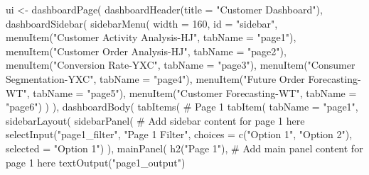 \documentclass[
  11pt,
]{article}
\newenvironment{Shaded}{\begin{snugshade}}{\end{snugshade}}
\newcommand{\AttributeTok}[1]{\textcolor[rgb]{0.40,0.45,0.13}{#1}}
\newcommand{\CommentTok}[1]{\textcolor[rgb]{0.37,0.37,0.37}{#1}}
\newcommand{\DecValTok}[1]{\textcolor[rgb]{0.68,0.00,0.00}{#1}}
\newcommand{\FunctionTok}[1]{\textcolor[rgb]{0.28,0.35,0.67}{#1}}
\newcommand{\NormalTok}[1]{\textcolor[rgb]{0.00,0.23,0.31}{#1}}
\newcommand{\OtherTok}[1]{\textcolor[rgb]{0.00,0.23,0.31}{#1}}
\newcommand{\StringTok}[1]{\textcolor[rgb]{0.13,0.47,0.30}{#1}}
\begin{document}
\begin{Shaded}
\begin{Highlighting}[]
\NormalTok{ui }\OtherTok{\textless{}{-}} \FunctionTok{dashboardPage}\NormalTok{(}
  \FunctionTok{dashboardHeader}\NormalTok{(}\AttributeTok{title =} \StringTok{"Customer Dashboard"}\NormalTok{),}
  \FunctionTok{dashboardSidebar}\NormalTok{(}
    \FunctionTok{sidebarMenu}\NormalTok{( }\AttributeTok{width =} \DecValTok{160}\NormalTok{,}
      \AttributeTok{id =} \StringTok{"sidebar"}\NormalTok{,}
      \FunctionTok{menuItem}\NormalTok{(}\StringTok{"Customer Activity Analysis{-}HJ"}\NormalTok{, }\AttributeTok{tabName =} \StringTok{"page1"}\NormalTok{),}
      \FunctionTok{menuItem}\NormalTok{(}\StringTok{"Customer Order Analysis{-}HJ"}\NormalTok{, }\AttributeTok{tabName =} \StringTok{"page2"}\NormalTok{),}
      \FunctionTok{menuItem}\NormalTok{(}\StringTok{"Conversion Rate{-}YXC"}\NormalTok{, }\AttributeTok{tabName =} \StringTok{"page3"}\NormalTok{),}
      \FunctionTok{menuItem}\NormalTok{(}\StringTok{"Consumer Segmentation{-}YXC"}\NormalTok{, }\AttributeTok{tabName =} \StringTok{"page4"}\NormalTok{),}
      \FunctionTok{menuItem}\NormalTok{(}\StringTok{"Future Order Forecasting{-}WT"}\NormalTok{, }\AttributeTok{tabName =} \StringTok{"page5"}\NormalTok{),}
      \FunctionTok{menuItem}\NormalTok{(}\StringTok{"Customer Forecasting{-}WT"}\NormalTok{, }\AttributeTok{tabName =} \StringTok{"page6"}\NormalTok{)}
\NormalTok{    )}
\NormalTok{  ),}
  \FunctionTok{dashboardBody}\NormalTok{(}
    \FunctionTok{tabItems}\NormalTok{(}
      \CommentTok{\# Page 1}
      \FunctionTok{tabItem}\NormalTok{(}
        \AttributeTok{tabName =} \StringTok{"page1"}\NormalTok{,}
        \FunctionTok{sidebarLayout}\NormalTok{(}
          \FunctionTok{sidebarPanel}\NormalTok{(}
            \CommentTok{\# Add sidebar content for page 1 here}
            \FunctionTok{selectInput}\NormalTok{(}\StringTok{"page1\_filter"}\NormalTok{, }\StringTok{"Page 1 Filter"}\NormalTok{,}
                        \AttributeTok{choices =} \FunctionTok{c}\NormalTok{(}\StringTok{"Option 1"}\NormalTok{, }\StringTok{"Option 2"}\NormalTok{),}
                        \AttributeTok{selected =} \StringTok{"Option 1"}\NormalTok{)}
\NormalTok{          ),}
          \FunctionTok{mainPanel}\NormalTok{(}
            \FunctionTok{h2}\NormalTok{(}\StringTok{"Page 1"}\NormalTok{),}
            \CommentTok{\# Add main panel content for page 1 here}
            \FunctionTok{textOutput}\NormalTok{(}\StringTok{"page1\_output"}\NormalTok{)}
\end{Highlighting}
\end{Shaded}
\end{document}
